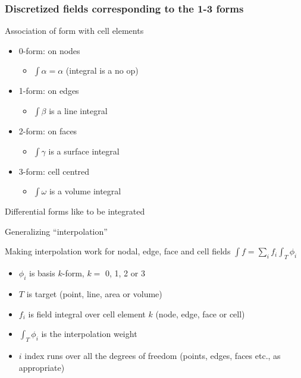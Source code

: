 \documentclass[aspectratio=169]{beamer}
\begin{document}
\begin{frame}[t]
  \frametitle{Discretized fields corresponding to the 1-3 forms}
    \begin{block}{Association of form with cell elements}
      \begin{itemize}%
	  \item 0-form: {\color{red} on nodes}
        \begin{itemize}
          \item $\int \alpha = \alpha$ (integral is a no op)
        \end{itemize}
      \item 1-form: {\color{red} on edges}
        \begin{itemize}
          \item $\int \beta$ is a line integral
        \end{itemize}
      \item 2-form: {\color{red} on faces}
        \begin{itemize}
          \item $\int \gamma$ is a surface integral
        \end{itemize}
      \item 3-form: {\color{red} cell centred}
        \begin{itemize}
          \item $\int \omega$ is a volume integral
        \end{itemize}
    \end{itemize}
  \end{block}
  \begin{block}{Differential forms like to be integrated}
  \end{block}
\end{frame}

\begin{frame}[fragile]{Generalizing ``interpolation''}
\begin{block}{Making interpolation work for nodal, edge, face and cell fields}
$\int f = \sum_i f_i \int_T \phi_i$
\begin{itemize}
\item $\phi_i$ is basis $k$-form, $k =$ 0, 1, 2 or 3
\item $T$ is target (point, line, area or volume)
\item $f_i$ is field integral over cell element $k$ (node, edge, face or cell)
\item $\int_T \phi_i$ is the {\color{red} interpolation weight}
\item $i$ index runs over all the degrees of freedom (points, edges, faces etc., as appropriate)
\end{itemize}
\end{block}
\end{frame}
\end{document}
